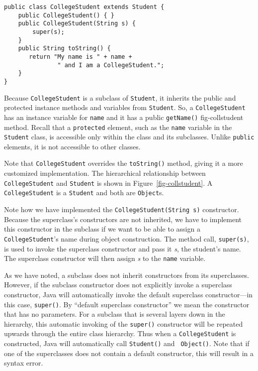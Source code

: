 \begin{jjjlisting}
\begin{lstlisting}
public class CollegeStudent extends Student {
    public CollegeStudent() { }
    public CollegeStudent(String s) {
        super(s);
    }
    public String toString() {
       return "My name is " + name +  
               " and I am a CollegeStudent.";
    }
}
\end{lstlisting}
\end{jjjlisting}

\noindent Because {\tt CollegeStudent} is a subclass of {\tt Student},
it inherits the public and protected instance methods and variables
from {\tt Student}. So, a {\tt CollegeStudent} has an instance
variable for {\tt name} and it has a public {\tt getName()}
{fig-collstudent}
method. Recall that a {\tt protected} element, such as the {\tt name}
variable in the {\tt Student} class, is accessible only within the
class and its subclasses. Unlike {\tt public} elements, it is not
accessible to other classes.

Note that {\tt CollegeStudent} overrides the {\tt toString()} method,
giving it a more customized implementation.  The hierarchical
relationship between {\tt CollegeStudent} and {\tt Student} is shown
in Figure~\ref{fig-collstudent}.  A {\tt CollegeStudent} is a {\tt Student} and both
are {\tt Object}s. 

Note how we have implemented the {\tt CollegeStudent(String s)}
constructor. Because the superclass's constructors are not inherited,
we have to implement this constructor in the subclass if we want to be
able to assign a {\tt CollegeStudent}'s name during object
construction.  The method call, {\tt super(s)}, is used to invoke the
superclass constructor and pass it {\em s}, the student's name. The
superclass constructor will then assign {\em s} to the {\tt name}
variable.

As we have noted, a subclass does not inherit constructors from its
 superclasses.  However, if the
subclass constructor does not explicitly invoke a superclass
constructor, Java will automatically invoke the default superclass
constructor---in this case, {\tt super()}.  By ``default superclass
constructor'' we mean the constructor that has no parameters.  For a
subclass that is several layers down in the hierarchy, this automatic
invoking of the {\tt super()} constructor will be repeated upwards
through the entire class hierarchy.  Thus when a {\tt CollegeStudent}
is constructed, Java will automatically call {\tt Student()} and {\tt
Object()}.  Note that if one of the superclasses does not contain a
default constructor, this will result in a syntax error.

